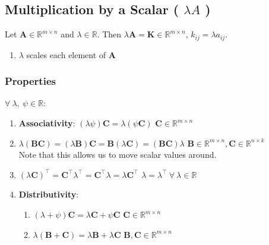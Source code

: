 \subsection{Multiplication by a Scalar ( $\lambda A$ )}

Let $\bm{A} \in \mathbb{R}^{m\times n}$ and $\lambda \in \mathbb{R}$. 
Then $\lambda \bm{A} = \bm{K} \in \mathbb{R}^{m\times n}$, $k_{ij} = \lambda a_{ij}$.
\hfill \cite{mfml/book/mml/Deisenroth-Faisal-Ong}


\begin{enumerate}
    \item $\lambda$ scales each element of $\bm{A}$
    \hfill \cite{mfml/book/mml/Deisenroth-Faisal-Ong}    
\end{enumerate}





\subsubsection{Properties}

$\forall\ \lambda,\ \psi \in \mathbb{R}$:
\vspace{0.2cm}
\begin{enumerate}
    \item \textbf{Associativity}:
    $(\lambda \psi )\bm{C} = \lambda (\psi \bm{C})$ \hfill $\bm{C} \in  \mathbb{R}^{m\times n}$
    \hfill \cite{mfml/book/mml/Deisenroth-Faisal-Ong}
    
    \item $
        \lambda (\bm{BC}) 
        = (\lambda \bm{B})\bm{C} 
        = \bm{B}(\lambda \bm{C}) 
        = (\bm{BC})\lambda 
        $ 
    \hfill $\bm{B} \in  \mathbb{R}^{m\times n}, \bm{C} \in  \mathbb{R}^{n\times k}$
    \hfill \cite{mfml/book/mml/Deisenroth-Faisal-Ong}
    \\
    Note that this allows us to move scalar values around.
    \hfill \cite{mfml/book/mml/Deisenroth-Faisal-Ong}

    \item $
        (\lambda \bm{C}) ^\top  
        = \bm{C}^\top \lambda ^\top  
        = \bm{C}^\top \lambda  
        = \lambda \bm{C}^\top 
    $
    \hfill $\lambda  = \lambda ^\top \  \forall \ \lambda  \in  \mathbb{R}$
    \hfill \cite{mfml/book/mml/Deisenroth-Faisal-Ong}

    \item \textbf{Distributivity}:
    \begin{enumerate}
        \item $(\lambda  + \psi )\bm{C} = \lambda \bm{C} + \psi \bm{C}$
        \hfill $\bm{C} \in  \mathbb{R}^{m\times n}$
        \hfill \cite{mfml/book/mml/Deisenroth-Faisal-Ong}

        \item $\lambda (\bm{B} + \bm{C}) = \lambda \bm{B} + \lambda \bm{C}$
        \hfill $\bm{B}, \bm{C} \in  \mathbb{R}^{m\times n}$
        \hfill \cite{mfml/book/mml/Deisenroth-Faisal-Ong}        
    \end{enumerate}
\end{enumerate}





